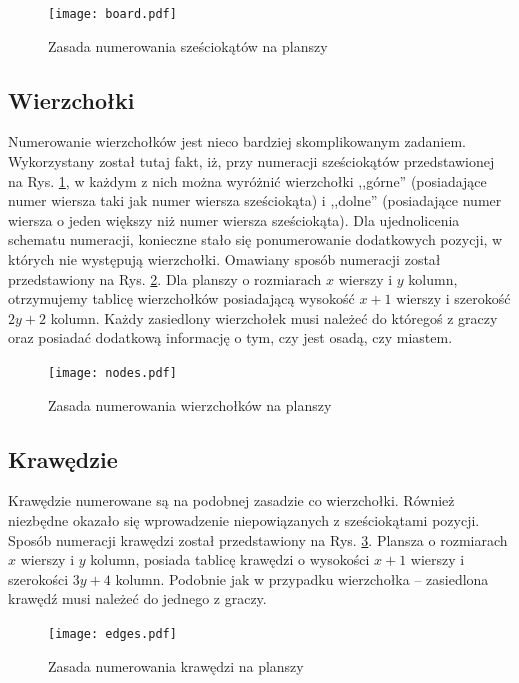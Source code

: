 \documentclass[11pt,twoside]{report}
\providecommand{\imref}[1]{Rys. \ref{#1}} %
\begin{document}
\begin{figure}[ht]
  \begin{center}
    \texttt{[image: board.pdf]}
  \end{center}
  \caption{Zasada numerowania sześciokątów na planszy}
  \label{board}
\end{figure}

\subsection{Wierzchołki}
Numerowanie wierzchołków jest nieco bardziej skomplikowanym
zadaniem. Wykorzystany został tutaj fakt, iż, przy numeracji
sześciokątów przedstawionej na \imref{board}, w każdym z nich można
wyróżnić wierzchołki ,,górne'' (posiadające numer wiersza taki jak
numer wiersza sześciokąta) i ,,dolne'' (posiadające numer wiersza o
jeden większy niż numer wiersza sześciokąta). Dla ujednolicenia
schematu numeracji, konieczne stało się ponumerowanie dodatkowych
pozycji, w których nie występują wierzchołki. Omawiany sposób
numeracji został przedstawiony na \imref{nodes}. Dla planszy o
rozmiarach $x$ wierszy i $y$ kolumn, otrzymujemy tablicę wierzchołków
posiadającą wysokość $x+1$ wierszy i szerokość $2y+2$ kolumn. Każdy
zasiedlony wierzchołek musi należeć do któregoś z graczy oraz posiadać
dodatkową informację o tym, czy jest osadą, czy miastem.

\begin{figure}[ht]
  \begin{center}
    \texttt{[image: nodes.pdf]}
  \end{center}
  \caption{Zasada numerowania wierzchołków na planszy}
  \label{nodes}
\end{figure}

\subsection{Krawędzie}
Krawędzie numerowane są na podobnej zasadzie co wierzchołki. Również
niezbędne okazało się wprowadzenie niepowiązanych z sześciokątami
pozycji. Sposób numeracji krawędzi został przedstawiony na
\imref{edges}. Plansza o rozmiarach $x$ wierszy i $y$ kolumn, posiada
tablicę krawędzi o wysokości $x+1$ wierszy i szerokości $3y+4$
kolumn. Podobnie jak w przypadku wierzchołka -- zasiedlona krawędź
musi należeć do jednego z graczy.

\begin{figure}[ht]
  \begin{center}
    \texttt{[image: edges.pdf]}
  \end{center}
  \caption{Zasada numerowania krawędzi na planszy}
  \label{edges}
\end{figure}
\end{document}
